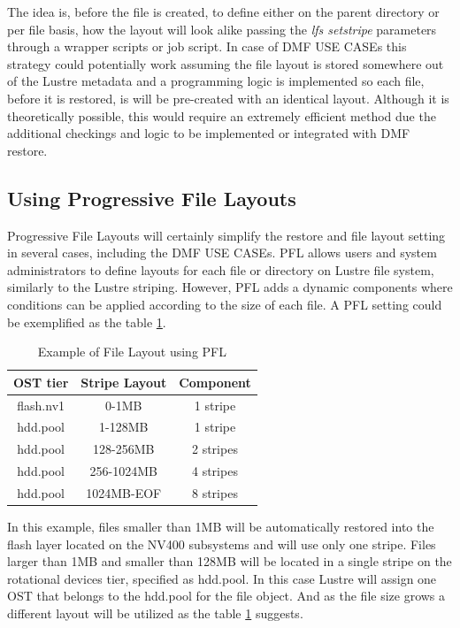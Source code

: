 \documentclass{article}
\begin{document}
The idea is, before the file is created, to define either on the parent directory or per file basis, how the layout will look alike passing the \textit{lfs setstripe} parameters through a wrapper scripts or job script. In case of DMF USE CASEs this strategy could potentially work assuming the file layout is stored somewhere out of the Lustre metadata and a programming logic is implemented so each file, before it is restored, is will be pre-created with an identical layout. Although it is theoretically possible, this would require an extremely efficient method due the additional checkings and logic to be implemented or integrated with DMF restore.

\subsection{Using Progressive File Layouts}
Progressive File Layouts will certainly simplify the restore and file layout setting in several cases, including the DMF USE CASEs. PFL allows users and system administrators to define layouts for each file or directory on Lustre file system, similarly to the Lustre striping. However, PFL adds a dynamic components where conditions can be applied according to the size of each file. A PFL setting could be exemplified as the table \ref{tab:Generic PFL Example}.

\begin{table}[h]
\centering
 \begin{tabular}{||c c c||} 
 \hline
 OST tier & Stripe Layout & Component \\ [0.5ex] 
 \hline\hline
 flash.nv1 & 0-1MB & 1 stripe \\ 
 \hline
 hdd.pool & 1-128MB & 1 stripe \\ 
 \hline
 hdd.pool & 128-256MB & 2 stripes\\
 \hline
  hdd.pool & 256-1024MB & 4 stripes\\
 \hline
   hdd.pool & 1024MB-EOF & 8 stripes\\
 \hline
 \end{tabular}
 \caption{Example of File Layout using PFL}
 \label{tab:Generic PFL Example}
\end{table}

In this example, files smaller than 1MB will be automatically restored into the flash layer located on the NV400 subsystems and will use only one stripe. Files larger than 1MB and smaller than 128MB will be located in a single stripe on the rotational devices tier, specified as hdd.pool. In this case Lustre will assign one OST that belongs to the hdd.pool for the file object. And as the file size grows a different layout will be utilized as the table \ref{tab:Generic PFL Example} suggests.
\end{document}
